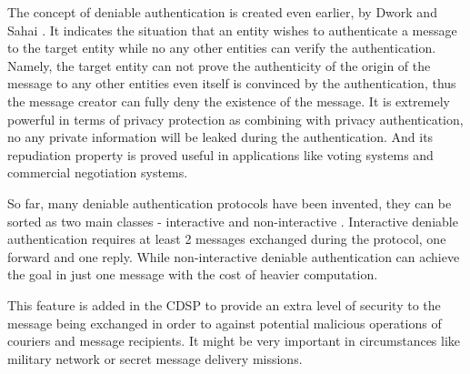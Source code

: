 The concept of deniable authentication is created even earlier, by Dwork and Sahai \cite{Dwork}. It indicates the situation that an entity wishes to authenticate a message to the target entity while no any other entities can verify the authentication. Namely, the target entity can not prove the authenticity of the origin of the message to any other entities even itself is convinced by the authentication, thus the message creator can fully deny the existence of the message. It is extremely powerful in terms of privacy protection as combining with privacy authentication, no any private information will be leaked during the authentication. And its repudiation property is proved useful in applications like voting systems and commercial negotiation systems.

So far, many deniable authentication protocols have been invented, they can be sorted as two main classes - interactive \cite{Borisov} and non-interactive \cite{Xin}\cite{Wang}\cite{Shao}. Interactive deniable authentication requires at least 2 messages exchanged during the protocol, one forward and one reply. While non-interactive deniable authentication can achieve the goal in just one message with the cost of heavier computation.

This feature is added in the CDSP to provide an extra level of security to the message being exchanged in order to against potential malicious operations of couriers and message recipients. It might be very important in circumstances like military network or secret message delivery missions.

